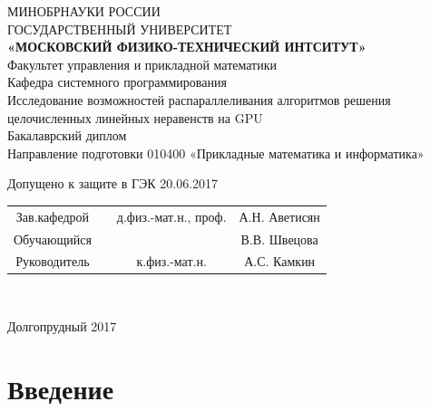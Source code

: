 \documentclass[a4paper,14pt,russian]{extreport}
\begin{document}
\begin{center}
\hfill \break
\large{МИНОБРНАУКИ РОССИИ}\\
\footnotesize{ГОСУДАРСТВЕННЫЙ УНИВЕРСИТЕТ}\\ 
\small{\textbf{«МОСКОВСКИЙ ФИЗИКО-ТЕХНИЧЕСКИЙ ИНТСИТУТ»}}\\
\normalsize{Факультет управления и прикладной математики}\\
\normalsize{Кафедра системного программирования}\\
\hfill\break
\hfill \break
\hfill \break
\large{Исследование возможностей распараллеливания алгоритмов решения целочисленных линейных неравенств на GPU}\\
\hfill \break
\hfill \break
\hfill \break
\normalsize{Бакалаврский диплом\\
\hfill \break
Направление подготовки 010400 «Прикладные математика и информатика»}\\
\hfill \break
\hfill \break
\end{center}
 
\normalsize{ \hspace{28pt} Допущено к защите в ГЭК  20.06.2017} \hfill \break
\hfill \break
 
\normalsize{ 
\begin{tabular}{cccc}
Зав.кафедрой & \underline{\hspace{3cm}} &  д.физ.-мат.н.,  проф. & А.Н. Аветисян \\
Обучающийся & \underline{\hspace{3cm}} & & В.В. Швецова \\
Руководитель & \underline{\hspace{3cm}}& к.физ.-мат.н.&  А.С. Камкин \\
\end{tabular}
}\\
\hfill \break
\hfill \break
\begin{center} Долгопрудный 2017 \end{center}
\thispagestyle{empty} %
 
 
\newpage
     
    \tableofcontents %
\newpage
 
\newpage


\chapter{Введение}
\end{document}
